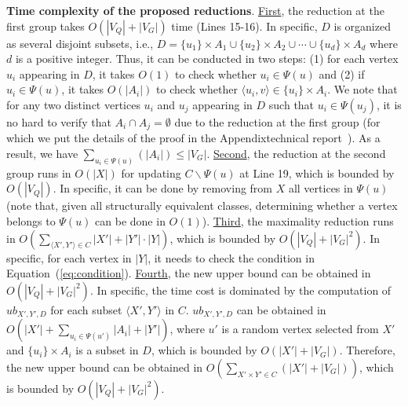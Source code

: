 \smallskip
\noindent\textbf{Time complexity of the proposed reductions}. \underline{First}, the reduction at the first group takes $O(|V_Q|+|V_G|)$ {\chengB time} (Lines 15-16). In specific, $D$ is organized as several disjoint subsets, i.e., $D=\{u_1\} \times A_1 \cup  \{u_2\} \times A_2\cup \cdots \cup \{u_d\} \times A_d $ where $d$ is a positive integer. 
%
Thus, it can be conducted in two steps: (1) for each vertex $u_i$ {\chengC appearing} in $D$, it takes $O(1)$ to check whether $u_i\in \Psi(u)$ and (2) if $u_i\in \Psi(u)$, it takes $O(|A_i|)$ to check whether $\langle u_i,v \rangle\in  \{u_i\} \times A_i$.
%
We note that for any two distinct vertices $u_i$ and $u_j$ appearing in $D$ such that $u_i\in \Psi(u_j)$, it is no hard to verify that $A_i\cap A_j=\emptyset$ due to the reduction at the first group (for which we put the details of the proof in the 
\ifx \CR\undefined
Appendix\else technical report~\cite{TR}\fi). 
As a result, we have $\sum_{u_i\in \Psi(u)} (|A_i|)\leq |V_G|$.  
%
\underline{Second}, the reduction at the second group runs in $O(|X|)$ for updating $C\backslash\Psi(u)$ at Line 19, which is bounded by $O(|V_Q|)$. In specific, it can be done by removing from $X$ all vertices in $\Psi(u)$ (note that, given all structurally equivalent classes, determining whether a vertex belongs to $\Psi(u)$ can be done in $O(1)$).
%
\underline{Third}, the maximality reduction runs in $O(\sum_{\langle X',Y' \rangle\in C}|X'|+|Y'|\cdot |Y|)$, which is bounded by $O(|V_Q|+|V_G|^2)$. In specific, for each vertex in $|Y|$, it needs to check the condition in Equation~(\ref{eq:condition}).
%
{\revision \underline{Fourth}}, the new upper bound can be obtained in $O(|V_Q|+|V_G|^2)$. In specific, the time cost is dominated by the computation of $ub_{X',Y',D}$ for each subset $\langle X',Y'\rangle$ in $C$. $ub_{X',Y',D}$ can be obtained in $O(|X'|+\sum_{u_i\in\Psi(u')} |A_i|+|Y'|)$, where $u'$ is a random vertex selected from $X'$ and $\{u_i\}\times A_i$ is a subset in $D$, which is bounded by $O(|X'|+|V_G|)$. Therefore, the new upper bound can be obtained in $O(\sum_{X'\times Y'\in C} (|X'|+|V_G|))$, which is bounded by $O(|V_Q|+|V_G|^2)$.

